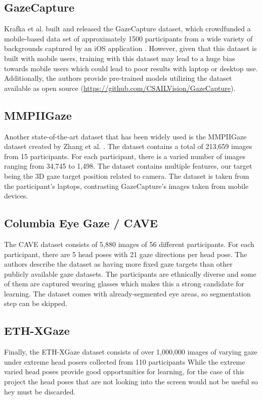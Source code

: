 \subsection{GazeCapture}
Krafka et al. built and released the GazeCapture dataset, which crowdfunded a mobile-based data set of approximately 1500 participants from a wide variety of backgrounds captured by an iOS application \cite{GazeCapture}. However, given that this dataset is built with mobile users, training with this dataset may lead to a huge bias towards mobile users which could lead to poor results with laptop or desktop use.
Additionally, the authors provide pre-trained models utilizing the dataset available as open source (\url{https://github.com/CSAILVision/GazeCapture}).

\subsection{MMPIIGaze}
Another state-of-the-art dataset that has been widely used is the MMPIIGaze dataset created by Zhang et al. \cite{GazeEstimationInTheWild}.
The dataset contains a total of 213,659 images from 15 participants. For each participant, there is a varied number of
images ranging from 34,745 to 1,498. The dataset contains multiple features, our target being the 3D gaze target position related to camera.
The dataset is taken from the participant's laptops, contrasting GazeCapture's images taken from mobile devices.

\subsection{Columbia Eye Gaze / CAVE}
The CAVE dataset \cite{CAVE_0324} consists of 5,880 images of 56 different participants. For each participant, there are 5 head poses with 21 gaze directions per head pose. The authors describe the dataset as having more fixed gaze targets than other publicly available gaze datasets. The participants are ethnically diverse and some of them are captured wearing glasses which makes this a strong candidate for learning. The dataset comes with already-segmented eye areas, so segmentation step can be skipped.

\subsection{ETH-XGaze}
Finally, the ETH-XGaze dataset \cite{Zhang2020ETHXGaze} consists of over 1,000,000 images of varying gaze under extreme head posers collected from 110 participants While the extreme varied head poses provide good opportunities for learning, for the case of this project the head poses that are not looking into the screen would not be useful so hey must be discarded.

